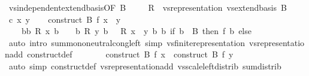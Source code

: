 \begin{isabellebody}
\ vs{}{\isachardot}{\kern0pt}independent{\isacharunderscore}{\kern0pt}extend{\isacharunderscore}{\kern0pt}basis{\isacharbrackleft}{\kern0pt}OF\ B{\isacharbrackright}{\kern0pt}\ \isacommand{{\isachardot}{\kern0pt}}\isamarkupfalse%
\isanewline
\ \ \isamarkupfalse%
\ {\isacharquery}{\kern0pt}R\ {\isacharequal}{\kern0pt}\ {\isachardoublequoteopen}vs{}{\isachardot}{\kern0pt}representation\ {\isacharparenleft}{\kern0pt}vs{}{\isachardot}{\kern0pt}extend{\isacharunderscore}{\kern0pt}basis\ B{\isacharparenright}{\kern0pt}{\isachardoublequoteclose}\isanewline
\ \ \isamarkupfalse%
\ c\ x\ y\isanewline
\ \ \isamarkupfalse%
\ {\isachardoublequoteopen}construct\ B\ f\ {\isacharparenleft}{\kern0pt}x\ {\isacharplus}{\kern0pt}\ y{\isacharparenright}{\kern0pt}\ {\isacharequal}{\kern0pt}\isanewline
\ \ \ \ {\isacharparenleft}{\kern0pt}{\isasymSum}b{\isasymin}{\isacharbraceleft}{\kern0pt}b{\isachardot}{\kern0pt}\ {\isacharquery}{\kern0pt}R\ x\ b\ {\isasymnoteq}\ {}{\isacharbraceright}{\kern0pt}\ {\isasymunion}\ {\isacharbraceleft}{\kern0pt}b{\isachardot}{\kern0pt}\ {\isacharquery}{\kern0pt}R\ y\ b\ {\isasymnoteq}\ {}{\isacharbraceright}{\kern0pt}{\isachardot}{\kern0pt}\ {\isacharquery}{\kern0pt}R\ {\isacharparenleft}{\kern0pt}x\ {\isacharplus}{\kern0pt}\ y{\isacharparenright}{\kern0pt}\ b\ {\isacharasterisk}{\kern0pt}b\ {\isacharparenleft}{\kern0pt}if\ b\ {\isasymin}\ B\ then\ f\ b\ else\ {}{\isacharparenright}{\kern0pt}{\isacharparenright}{\kern0pt}{\isachardoublequoteclose}\isanewline
\ \ \ \ \isamarkupfalse%
\ {\isacharparenleft}{\kern0pt}auto\ intro{\isacharbang}{\kern0pt}{\isacharcolon}{\kern0pt}\ sum{\isachardot}{\kern0pt}mono{\isacharunderscore}{\kern0pt}neutral{\isacharunderscore}{\kern0pt}cong{\isacharunderscore}{\kern0pt}left\ simp{\isacharcolon}{\kern0pt}\ vs{}{\isachardot}{\kern0pt}finite{\isacharunderscore}{\kern0pt}representation\ vs{}{\isachardot}{\kern0pt}representation{\isacharunderscore}{\kern0pt}add\ construct{\isacharunderscore}{\kern0pt}def{\isacharparenright}{\kern0pt}\isanewline
\ \ \isamarkupfalse%
\ \isamarkupfalse%
\ {\isachardoublequoteopen}{\isasymdots}\ {\isacharequal}{\kern0pt}\ construct\ B\ f\ x\ {\isacharplus}{\kern0pt}\ construct\ B\ f\ y{\isachardoublequoteclose}\isanewline
\ \ \ \ \isamarkupfalse%
\ {\isacharparenleft}{\kern0pt}auto\ simp{\isacharcolon}{\kern0pt}\ construct{\isacharunderscore}{\kern0pt}def\ vs{}{\isachardot}{\kern0pt}representation{\isacharunderscore}{\kern0pt}add\ vs{}{\isachardot}{\kern0pt}scale{\isacharunderscore}{\kern0pt}left{\isacharunderscore}{\kern0pt}distrib\ sum{\isachardot}{\kern0pt}distrib\isanewline

\end{isabellebody}
